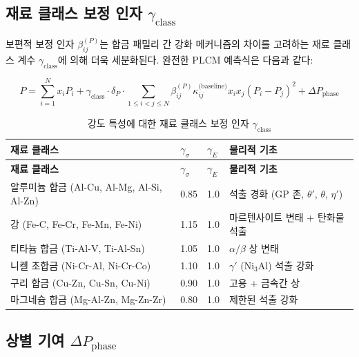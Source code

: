 \documentclass[12pt,a4paper]{article}
\begin{document}
	\subsection{재료 클래스 보정 인자 \(\gamma_{\text{class}}\)}
	\label{subsec:material-class-factors}
	
	보편적 보정 인자 \(\beta_{ij}^{(P)}\)는 합금 패밀리 간 강화 메커니즘의 차이를 고려하는 재료 클래스 계수 \(\gamma_{\text{class}}\)에 의해 더욱 세분화된다. 완전한 PLCM 예측식은 다음과 같다:
	
	\begin{equation}
		\boxed{P = \sum_{i=1}^{N} x_i P_i + \gamma_{\text{class}} \cdot \delta_P \cdot \sum_{1\le i<j\le N} \beta_{ij}^{(P)} \kappa_{ij}^{\text{(baseline)}} x_i x_j (P_i - P_j)^2 + \Delta P_{\text{phase}}}
		\label{eq:plcm-full-calibration}
	\end{equation}
	
	\begin{longtable}{p{3.5cm}p{2.5cm}p{2.5cm}p{5cm}}
		\caption{강도 특성에 대한 재료 클래스 보정 인자 \(\gamma_{\text{class}}\)} \label{tab:material-class-factors} \\
		\toprule
		\textbf{재료 클래스} & \(\gamma_{\sigma}\) & \(\gamma_{E}\) & \textbf{물리적 기초} \\
		\midrule
		\endfirsthead
		\toprule
		\textbf{재료 클래스} & \(\gamma_{\sigma}\) & \(\gamma_{E}\) & \textbf{물리적 기초} \\
		\midrule
		\endhead
		알루미늄 합금 (Al-Cu, Al-Mg, Al-Si, Al-Zn) & 0.85 & 1.0 & 석출 경화 (GP 존, \(\theta'\), \(\theta\), \(\eta'\)) \\
		강 (Fe-C, Fe-Cr, Fe-Mn, Fe-Ni) & 1.15 & 1.0 & 마르텐사이트 변태 + 탄화물 석출 \\
		티타늄 합금 (Ti-Al-V, Ti-Al-Sn) & 1.05 & 1.0 & \(\alpha/\beta\) 상 변태 \\
		니켈 초합금 (Ni-Cr-Al, Ni-Cr-Co) & 1.10 & 1.0 & \(\gamma'\) (Ni\(_3\)Al) 석출 강화 \\
		구리 합금 (Cu-Zn, Cu-Sn, Cu-Ni) & 0.90 & 1.0 & 고용 + 금속간 상 \\
		마그네슘 합금 (Mg-Al-Zn, Mg-Zn-Zr) & 0.80 & 1.0 & 제한된 석출 강화 \\
		\bottomrule
	\end{longtable}
	
	\subsection{상별 기여 \(\Delta P_{\text{phase}}\)}
	\label{subsec:phase-contributions}
	
\end{document}
